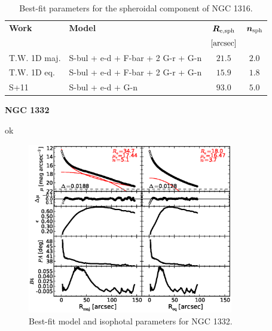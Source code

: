 \documentclass[preprint2]{emulateapj}
\newcommand{\fitfigurewidth}{0.8\textwidth}
\begin{document}
  \begin{table}[h]
  \small
  \caption{Best-fit parameters for the spheroidal component of NGC 1316.}
  \begin{center}
  \begin{tabular}{llcc}
  \hline
  {\bf Work} & {\bf Model}   & $\bm R_{\rm e,sph}$    & $\bm n_{\rm sph}$ \\
    &  &  $[\rm arcsec]$ & \\
  \hline
  T.W. 1D maj. & S-bul + e-d + F-bar + 2 G-r + G-n & $21.5$  &  $2.0$ \\
  T.W. 1D eq.  & S-bul + e-d + F-bar + 2 G-r + G-n & $15.9$  &  $1.8$ \\
  \hline
  S+11      & S-bul + e-d + G-n & $93.0$  &  $5.0$ \\
  \hline
  \end{tabular}
  \end{center}
  \label{tab:n1316}
  \end{table}

  \clearpage\newpage\noindent
  {\bf NGC 1332 \\}

  ok

  \begin{figure}[h]
  \begin{center}
  \includegraphics[width=\fitfigurewidth]{images/n1332_1Dfit.eps}
  \caption{Best-fit model and isophotal parameters for NGC 1332.}
  \end{center}
  \end{figure}
\end{document}
